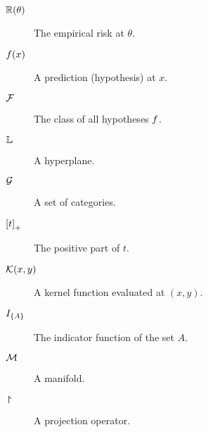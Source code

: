 \begin{description}
\item[$\mathbb{R}(\theta)$] The empirical risk at $\theta$.
\item[$f(x)$] A prediction (hypothesis) at $x$.
\item[$\mathcal{F}$] The class of all hypotheses $f$.
\item[$\mathbb{L}$] A hyperplane.
\item[$\mathcal{G}$] A set of categories. 
\item[$\left[ t \right]_+$] The positive part of $t$.
\item[$\mathcal{K}(x,y)$] A kernel function evaluated at $(x,y)$.
\item[$I_{\left\{ A \right\}}$] The indicator function of the set $A$.
\item[$\mathcal{M}$] A manifold.
\item[$\project$] A projection operator.

\end{description}


